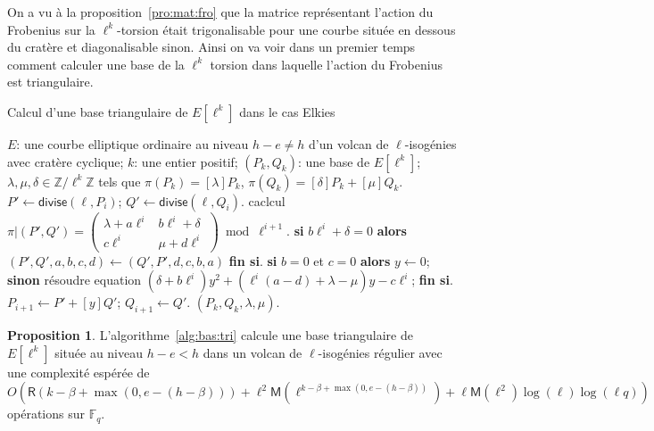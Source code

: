 \documentclass[10pt,a4paper]{book}
\theoremstyle{plain}
\theoremstyle{definition}
\theoremstyle{definition}
\theoremstyle{definition}
\newtheorem{prop}[thm]{Proposition}
\theoremstyle{definition}
\theoremstyle{remark}
\theoremstyle{remark}
\theoremstyle{definition}
\begin{document}
On a vu à la proposition~\ref{pro:mat:fro} que la matrice représentant l'action
du Frobenius sur la $\ell^k$-torsion était trigonalisable pour une courbe 
située en dessous du cratère et diagonalisable sinon. Ainsi on va voir dans un 
premier temps comment calculer une base de la $\ell^k$ torsion dans laquelle 
l'action du Frobenius est triangulaire.

\begin{algorithm}
\caption{\label{alg:bas:tri}Calcul d'une base triangulaire de $E[\ell^k]$ dans le cas Elkies}
\begin{algorithmic}[1]
\REQUIRE $E$: une courbe elliptique ordinaire au niveau $h-e \neq h$ d'un volcan de $\ell$-isogénies avec cratère cyclique;
$k$: une entier positif;
\ENSURE $(P_k, Q_k )$: une base de $E[\ell^k]$;
$\lambda, \mu, \delta \in \mathbb{Z}/\ell^k \mathbb{Z}$
tels que $\pi(P_k)= [\lambda] P_k$, $ \pi(Q_k)=[\delta] P_k +  [\mu] Q_k$.
\STATE\label{alg:point:divide}
  $P' \leftarrow \mathsf{divise}(\ell, P_{i})$; $Q' \leftarrow \mathsf{divise} (\ell, Q_{i})$.
\STATE\label{alg:trigonal:frobenius}
  caclcul $\pi|(P',Q')=\left( \begin{smallmatrix}
\lambda + a\ell^{i} & b\ell^{i} + \delta \\
c\ell^{i} & \mu + d\ell^{i} \end{smallmatrix} \right) \bmod {\ell^{i+1}}.$
\STATE 
  \textbf{si} $b \ell^i + \delta=0$ \textbf{alors} $(P',Q',a,b,c,d) \leftarrow (Q',P',d,c,b,a) $  \textbf{fin si}.
\STATE
  \textbf{si} $b = 0$ et $c=0$ \textbf{alors} $y \leftarrow 0$;
\STATE\label{alg:trigonal:solve1}
  \textbf{sinon} résoudre equation
 $( \delta + b \ell^i) y^2 + (\ell^i(a-d)+\lambda - \mu)y - c\ell^i $; \textbf{fin si}.
\STATE
  $P_{i+1} \leftarrow P' + [y] Q'$; $Q_{i+1} \leftarrow  Q'$.
\ENDFOR
\RETURN $(P_{k},Q_{k},\lambda,\mu).$
\end{algorithmic}
\end{algorithm}
\begin{prop}
L'algorithme~\ref{alg:bas:tri} calcule une base triangulaire de $E[\ell^k]$ située au niveau $h-e<h$ dans un volcan de $\ell$-isogénies régulier avec une complexité espérée de 
$O(\mathsf{R}(k-\beta+\max(0,e-(h-\beta))) + \ell^2\mathsf{M}(\ell^{k-\beta+\max(0,e-(h-\beta))})+ \ell\mathsf{M}(\ell^2)\log(\ell)\log(\ell q))$ opérations sur $\mathbb{F}_q$.
\end{prop}
\end{document}
